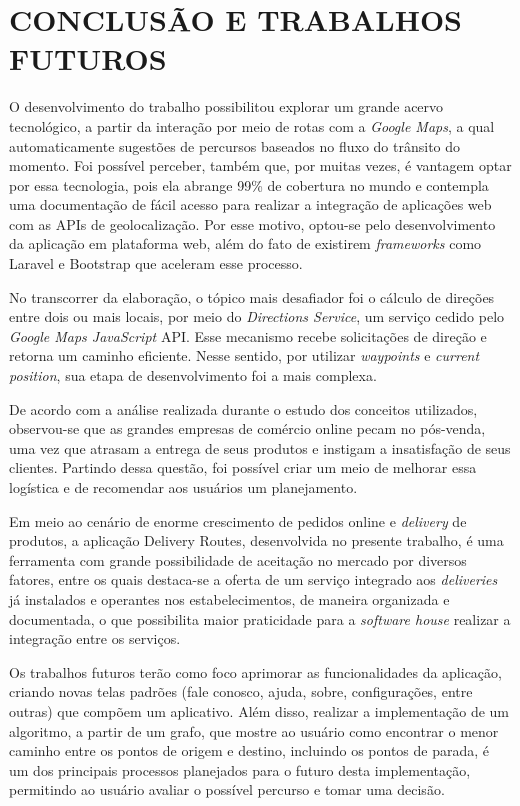 \chapter{CONCLUSÃO E TRABALHOS FUTUROS}
O desenvolvimento do trabalho possibilitou explorar um grande acervo tecnológico, a partir da interação por meio de rotas com a \textit{Google Maps}, a qual automaticamente sugestões de percursos baseados no fluxo do trânsito do momento. Foi possível perceber, também que, por muitas vezes, é vantagem optar por essa tecnologia, pois ela abrange 99\% de cobertura no mundo e contempla uma documentação de fácil acesso para realizar a integração de aplicações web com as APIs de geolocalização. Por esse motivo, optou-se pelo desenvolvimento da aplicação em plataforma web, além do fato de existirem \textit{frameworks} como Laravel e Bootstrap que aceleram esse processo.

No transcorrer da elaboração, o tópico mais desafiador foi o cálculo de direções entre dois ou mais locais, por meio do \textit{Directions Service}, um serviço cedido pelo \textit{Google Maps JavaScript} API. Esse mecanismo recebe solicitações de direção e retorna um caminho eficiente. Nesse sentido, por utilizar \textit{waypoints} e \textit{current position}, sua etapa de desenvolvimento foi a mais complexa.

De acordo com a análise realizada durante o estudo dos conceitos utilizados, observou-se que as grandes empresas de comércio online pecam no pós-venda, uma vez que atrasam a entrega de seus produtos e instigam a insatisfação de seus clientes. Partindo dessa questão, foi possível criar um meio de melhorar essa logística e de recomendar aos usuários um planejamento.

Em meio ao cenário de enorme crescimento de pedidos online e \textit{delivery} de produtos, a aplicação Delivery Routes, desenvolvida no presente trabalho, é uma ferramenta com grande possibilidade de aceitação no mercado por diversos fatores, entre os quais destaca-se a oferta de um serviço integrado aos \textit{deliveries} já instalados e operantes nos estabelecimentos, de maneira organizada e documentada, o que possibilita maior praticidade para a \textit{software house} realizar a integração entre os serviços.


Os trabalhos futuros terão como foco aprimorar as funcionalidades da aplicação, criando novas telas padrões (fale conosco, ajuda, sobre, configurações, entre outras) que compõem um aplicativo. 
Além disso, realizar a implementação de um algoritmo, a partir de um grafo, que mostre ao usuário como encontrar o menor caminho entre os pontos de origem e destino, incluindo os pontos de parada, é um dos principais processos planejados para o futuro desta implementação, permitindo ao usuário avaliar o possível percurso e tomar uma decisão. %

